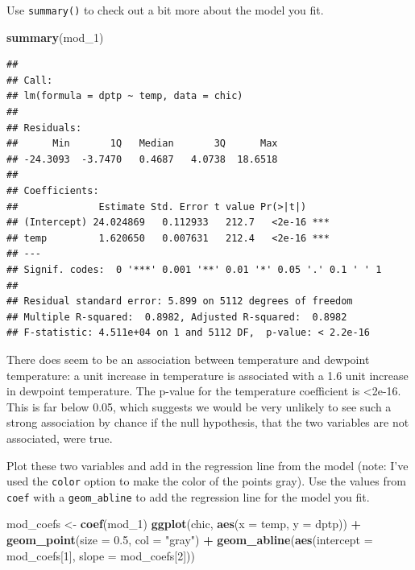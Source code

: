 \documentclass[]{book}
\makeatletter
\newenvironment{Shaded}{\begin{snugshade}}{\end{snugshade}}
\newcommand{\KeywordTok}[1]{\textcolor[rgb]{0.13,0.29,0.53}{\textbf{#1}}}
\newcommand{\DataTypeTok}[1]{\textcolor[rgb]{0.13,0.29,0.53}{#1}}
\newcommand{\DecValTok}[1]{\textcolor[rgb]{0.00,0.00,0.81}{#1}}
\newcommand{\FloatTok}[1]{\textcolor[rgb]{0.00,0.00,0.81}{#1}}
\newcommand{\StringTok}[1]{\textcolor[rgb]{0.31,0.60,0.02}{#1}}
\newcommand{\OperatorTok}[1]{\textcolor[rgb]{0.81,0.36,0.00}{\textbf{#1}}}
\newcommand{\NormalTok}[1]{#1}
\newenvironment{kframe}{%
\medskip{}
\setlength{\fboxsep}{.8em}
 \def\at@end@of@kframe{}%
 \ifinner\ifhmode%
  \def\at@end@of@kframe{\end{minipage}}%
  \begin{minipage}{\columnwidth}%
 \fi\fi%
 \def\FrameCommand##1{\hskip\@totalleftmargin \hskip-\fboxsep
 \colorbox{shadecolor}{##1}\hskip-\fboxsep
     \hskip-\linewidth \hskip-\@totalleftmargin \hskip\columnwidth}%
 \MakeFramed {\advance\hsize-\width
   \@totalleftmargin\z@ \linewidth\hsize
   \@setminipage}}%
 {\par\unskip\endMakeFramed%
 \at@end@of@kframe}
\renewenvironment{Shaded}{\begin{kframe}}{\end{kframe}}
\theoremstyle{definition}
\theoremstyle{definition}
\theoremstyle{definition}
\theoremstyle{remark}
\makeatother
\begin{document}
Use \texttt{summary()} to check out a bit more about the model you fit.

\begin{Shaded}
\begin{Highlighting}[]
\KeywordTok{summary}\NormalTok{(mod_}\DecValTok{1}\NormalTok{)}
\end{Highlighting}
\end{Shaded}

\begin{verbatim}
## 
## Call:
## lm(formula = dptp ~ temp, data = chic)
## 
## Residuals:
##      Min       1Q   Median       3Q      Max 
## -24.3093  -3.7470   0.4687   4.0738  18.6518 
## 
## Coefficients:
##              Estimate Std. Error t value Pr(>|t|)    
## (Intercept) 24.024869   0.112933   212.7   <2e-16 ***
## temp         1.620650   0.007631   212.4   <2e-16 ***
## ---
## Signif. codes:  0 '***' 0.001 '**' 0.01 '*' 0.05 '.' 0.1 ' ' 1
## 
## Residual standard error: 5.899 on 5112 degrees of freedom
## Multiple R-squared:  0.8982, Adjusted R-squared:  0.8982 
## F-statistic: 4.511e+04 on 1 and 5112 DF,  p-value: < 2.2e-16
\end{verbatim}

There does seem to be an association between temperature and dewpoint
temperature: a unit increase in temperature is associated with a 1.6
unit increase in dewpoint temperature. The p-value for the temperature
coefficient is \textless{}2e-16. This is far below 0.05, which suggests
we would be very unlikely to see such a strong association by chance if
the null hypothesis, that the two variables are not associated, were
true.

Plot these two variables and add in the regression line from the model
(note: I've used the \texttt{color} option to make the color of the
points gray). Use the values from \texttt{coef} with a
\texttt{geom\_abline} to add the regression line for the model you fit.

\begin{Shaded}
\begin{Highlighting}[]
\NormalTok{mod_coefs <-}\StringTok{ }\KeywordTok{coef}\NormalTok{(mod_}\DecValTok{1}\NormalTok{)}
\KeywordTok{ggplot}\NormalTok{(chic, }\KeywordTok{aes}\NormalTok{(}\DataTypeTok{x =}\NormalTok{ temp, }\DataTypeTok{y =}\NormalTok{ dptp)) }\OperatorTok{+}\StringTok{ }
\StringTok{  }\KeywordTok{geom_point}\NormalTok{(}\DataTypeTok{size =} \FloatTok{0.5}\NormalTok{, }\DataTypeTok{col =} \StringTok{"gray"}\NormalTok{) }\OperatorTok{+}\StringTok{ }
\StringTok{  }\KeywordTok{geom_abline}\NormalTok{(}\KeywordTok{aes}\NormalTok{(}\DataTypeTok{intercept =}\NormalTok{ mod_coefs[}\DecValTok{1}\NormalTok{], }\DataTypeTok{slope =}\NormalTok{ mod_coefs[}\DecValTok{2}\NormalTok{]))}
\end{Highlighting}
\end{Shaded}
\end{document}

